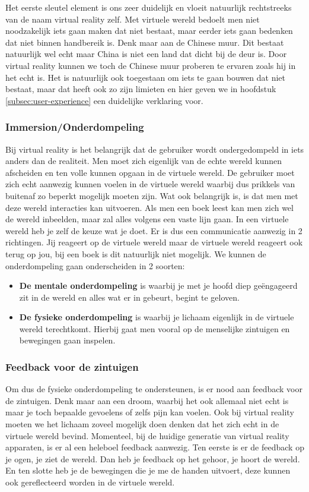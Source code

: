 Het eerste sleutel element is ons zeer duidelijk en vloeit natuurlijk rechtstreeks van de naam virtual reality zelf. Met virtuele wereld bedoelt men niet noodzakelijk iets gaan maken dat niet bestaat, maar eerder iets gaan bedenken dat niet binnen handbereik is. Denk maar aan de Chinese muur. Dit bestaat natuurlijk wel echt maar China is niet een land dat dicht bij de deur is. Door virtual reality kunnen we toch de Chinese muur proberen te ervaren zoals hij in het echt is. Het is natuurlijk ook toegestaan om iets te gaan bouwen dat niet bestaat, maar dat heeft ook zo zijn limieten en hier geven we in hoofdstuk \ref{subsec:user-experience} een duidelijke verklaring voor.

\subsubsection{Immersion/Onderdompeling}
\label{ssubsec:immersion}
Bij virtual reality is het belangrijk dat de gebruiker wordt ondergedompeld in iets anders dan de realiteit. Men moet zich eigenlijk van de echte wereld kunnen afscheiden en ten volle kunnen opgaan in de virtuele wereld. De gebruiker moet zich echt aanwezig kunnen voelen in de virtuele wereld waarbij dus prikkels van buitenaf zo beperkt mogelijk moeten zijn. Wat ook belangrijk is, is dat men met deze wereld interacties kan uitvoeren. Als men een boek leest kan men zich wel de wereld inbeelden, maar zal alles volgens een vaste lijn gaan. In een virtuele wereld heb je zelf de keuze wat je doet. Er is dus een communicatie aanwezig in 2 richtingen. Jij reageert op de virtuele wereld maar de virtuele wereld reageert ook terug op jou, bij een boek is dit natuurlijk niet mogelijk. We kunnen de onderdompeling gaan onderscheiden in 2 soorten:

\begin{itemize}
	\item \textbf{De mentale onderdompeling} is waarbij je met je hoofd diep geëngageerd zit in de wereld en alles wat er in gebeurt, begint te geloven.
	\item \textbf{De fysieke onderdompeling} is waarbij je lichaam eigenlijk in de virtuele wereld terechtkomt. Hierbij gaat men vooral op de menselijke zintuigen en bewegingen gaan inspelen.
\end{itemize}

\subsubsection{Feedback voor de zintuigen}
\label{ssubsec:feedback-van-zintuigen}
Om dus de fysieke onderdompeling te ondersteunen, is er nood aan feedback voor de zintuigen. Denk maar aan een droom, waarbij het ook allemaal niet echt is maar je toch bepaalde gevoelens of zelfs pijn kan voelen. Ook bij virtual reality moeten we het lichaam zoveel mogelijk doen denken dat het zich echt in de virtuele wereld bevind. Momenteel, bij de huidige generatie van virtual reality apparaten, is er al een heleboel feedback aanwezig. Ten eerste is er de feedback op je ogen, je ziet de wereld. Dan heb je feedback op het gehoor, je hoort de wereld. En ten slotte heb je de bewegingen die je me de handen uitvoert, deze kunnen ook gereflecteerd worden in de virtuele wereld.

